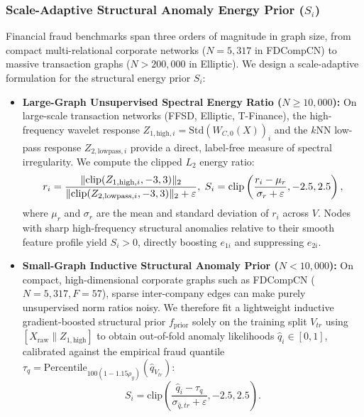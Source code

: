 \documentclass[10pt,a4paper,twocolumn]{article}
\begin{document}
\subsubsection{Scale-Adaptive Structural Anomaly Energy Prior (\texorpdfstring{$S_i$}{Si})}

Financial fraud benchmarks span three orders of magnitude in graph size, from compact multi-relational corporate networks ($N = 5,317$ in FDCompCN) to massive transaction graphs ($N > 200,000$ in Elliptic). We design a scale-adaptive formulation for the structural energy prior $S_i$:

\begin{itemize}
  \item \textbf{Large-Graph Unsupervised Spectral Energy Ratio ($N \ge 10,000$):} On large-scale transaction networks (FFSD, Elliptic, T-Finance), the high-frequency wavelet response $Z_{1,\text{high},i} = \text{Std}(W_{C,0}(X))_i$ and the $k$NN low-pass response $Z_{2,\text{lowpass},i}$ provide a direct, label-free measure of spectral irregularity. We compute the clipped $L_2$ energy ratio:
  \begin{equation}
    \resizebox{0.88\linewidth}{!}{$\displaystyle r_i = \frac{\|\text{clip}(Z_{1,\text{high},i}, -3, 3)\|_2}{\|\text{clip}(Z_{2,\text{lowpass},i}, -3, 3)\|_2 + \varepsilon}, \; S_i = \text{clip}\left(\frac{r_i - \mu_r}{\sigma_r + \varepsilon}, -2.5, 2.5\right),$}
  \end{equation}
  where $\mu_r$ and $\sigma_r$ are the mean and standard deviation of $r_i$ across $V$. Nodes with sharp high-frequency structural anomalies relative to their smooth feature profile yield $S_i > 0$, directly boosting $e_{1i}$ and suppressing $e_{2i}$.

  \item \textbf{Small-Graph Inductive Structural Anomaly Prior ($N < 10,000$):} On compact, high-dimensional corporate graphs such as FDCompCN ($N = 5,317, F = 57$), sparse inter-company edges can make purely unsupervised norm ratios noisy. We therefore fit a lightweight inductive gradient-boosted structural prior $f_{\text{prior}}$ solely on the training split $V_{tr}$ using $[X_{\text{raw}} \parallel Z_{1,\text{high}}]$ to obtain out-of-fold anomaly likelihoods $\hat{q}_i \in [0, 1]$, calibrated against the empirical fraud quantile $\tau_q = \text{Percentile}_{100(1 - 1.15\rho_y)}(\hat{q}_{V_{tr}})$:
  \begin{equation}
    S_i = \text{clip}\left(\frac{\hat{q}_i - \tau_q}{\sigma_{\hat{q},tr} + \varepsilon}, -2.5, 2.5\right).
  \end{equation}
\end{itemize}
\end{document}
